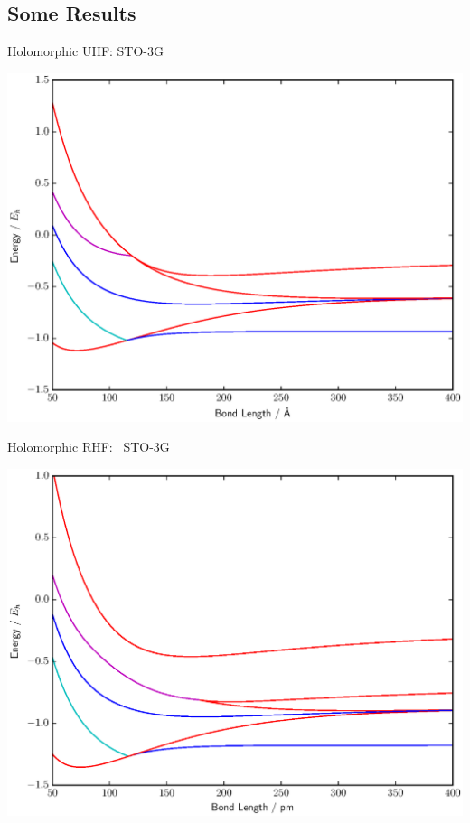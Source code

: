 \documentclass{beamer}
\begin{document}
\subsection{Some Results}
\begin{frame}{Holomorphic UHF:  STO-3G}
\vspace{-0.9em}
  \begin{center}
    \includegraphics[scale=0.45]{BFGS_UHF_HH_sto-3g}
  \end{center}
\end{frame}

\begin{frame}{Holomorphic RHF: \ STO-3G}
\vspace{-0.9em}
  \begin{center}
    \includegraphics[scale=0.45]{BFGS_UHF_HZ_0-20_sto-3g}
  \end{center}
\end{frame}
\end{document}
